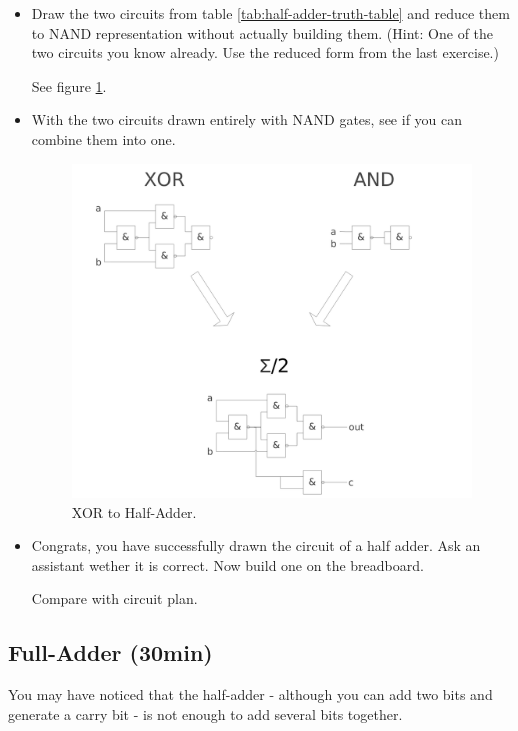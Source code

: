 \documentclass[10pt,a4paper]{article}
\begin{document}
\begin{itemize}
		\item Draw the two circuits from table \ref{tab:half-adder-truth-table} and reduce them to NAND representation without actually building them. (Hint: One of the two circuits you know already. Use the reduced form from the last exercise.)
		\begin{center}
			See figure \ref{fig:xor-to-half-adder}.
		\end{center}
		\item With the two circuits drawn entirely with NAND gates, see if you can combine them into one.
		\begin{figure}[H]
			\centering		  
			\includegraphics[scale=0.3]{xor_to_half_adder}
			\caption{XOR to Half-Adder.}
			\label{fig:xor-to-half-adder}
		\end{figure}
		\item Congrats, you have successfully drawn the circuit of a half adder. Ask an assistant wether it is correct. Now build one on the breadboard.
		\begin{center}
			Compare with circuit plan.
		\end{center}		
	\end{itemize}


	\subsection{Full-Adder (30min)}
	You may have noticed that the half-adder - although you can add two bits and generate a carry bit - is not enough to add several bits together.
	
\end{document}
